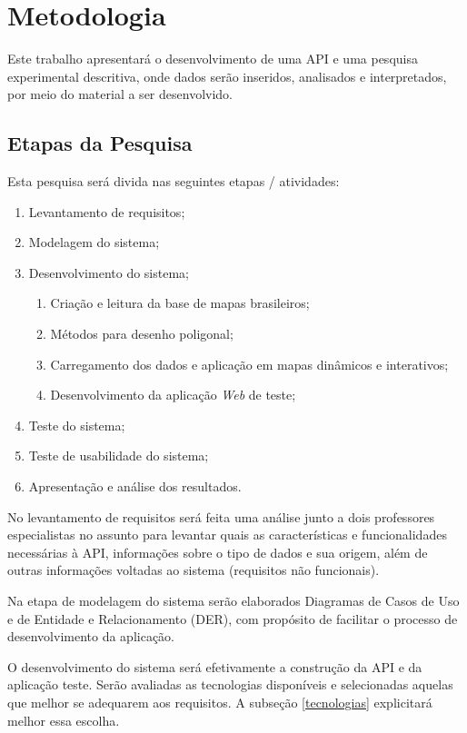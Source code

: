 \documentclass[12pt]{article}
\begin{document}
\section{Metodologia} \label{metodologia}

Este trabalho apresentará o desenvolvimento de uma API e uma pesquisa experimental descritiva, onde dados serão inseridos, analisados e interpretados, por meio do material a ser desenvolvido.

\subsection{Etapas da Pesquisa} \label{atividades}

Esta pesquisa será divida nas seguintes etapas / atividades:

\begin{enumerate}[I]
  \item{Levantamento de requisitos;}  
  \item{Modelagem do sistema;}
  \item{Desenvolvimento do sistema;}  
  	\begin{enumerate}
    	\item{Criação e leitura da base de mapas brasileiros;}  
        \item{Métodos para desenho poligonal;}  
        \item{Carregamento dos dados e aplicação em mapas dinâmicos e interativos;} 
    	\item{Desenvolvimento da aplicação \emph{Web} de teste;} 
  	\end{enumerate}
  \item{Teste do sistema;}  
  \item{Teste de usabilidade do sistema;}  
  \item{Apresentação e análise dos resultados.}
\end{enumerate}

No levantamento de requisitos será feita uma análise junto a dois professores especialistas no assunto para levantar quais as características e funcionalidades necessárias à API, informações sobre o tipo de dados e sua origem, além de outras informações voltadas ao sistema (requisitos não funcionais).

Na etapa de modelagem do sistema serão elaborados Diagramas de Casos de Uso e de Entidade e Relacionamento (DER), com propósito de facilitar o processo de desenvolvimento da aplicação.

O desenvolvimento do sistema será efetivamente a construção da API e da aplicação teste. Serão avaliadas as tecnologias disponíveis e selecionadas aquelas que melhor se adequarem aos requisitos. A subseção \ref{tecnologias} explicitará melhor essa escolha.
\end{document}
